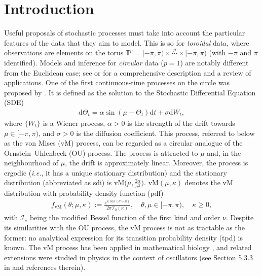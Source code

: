 \documentclass[oneside,11pt]{article}
\newcommand{\T}{\mathbb{T}}
\newcommand{\rd}{\mathrm{d}}
\newcommand{\Ical}{\mathcal{I}}
\begin{document}
\section{Introduction}
\label{sec:intro}

Useful proposals of stochastic processes must take into account the particular features of the data that they aim to model. This is so for \textit{toroidal} data, where observations are elements on the torus
$\T^p=[-\pi,\pi)\times\overset{p}{\cdots}\times[-\pi,\pi)$ (with $-\pi$ and $\pi$ identified). Models and
inference for \textit{circular} data ($p=1$) are notably different from the Euclidean
case; see \cite{Mardia2000} or \cite{Jammalamadaka2001} for
a comprehensive description and a review of applications. One of the first continuous-time processes on the circle was proposed by \cite{Kent1975}. It is defined
as the solution to the Stochastic Differential Equation (SDE)
\begin{align}
\rd \Theta_t=\alpha\sin(\mu-\Theta_t)\rd t+\sigma\rd W_t,\label{eq:vMOU}
\end{align}
where $\{W_t\}$ is a Wiener process, $\alpha>0$ is the strength of the drift towards $\mu\in[-\pi,\pi)$, and $\sigma>0$ is the diffusion coefficient. This process, referred to below as the von Mises (vM) process, can be regarded as a circular analogue of the Ornstein--Uhlenbeck (OU) process. The process is attracted to $\mu$ and, in the neighbourhood of $\mu$, the drift is approximately linear. Moreover, the process is ergodic (\textit{i.e.}, it has a unique stationary distribution) and the stationary distribution (abbreviated as sdi) is $\mathrm{vM}\big(\mu,
\frac{2\alpha}{\sigma^2}\big)$. $\mathrm{vM}(\mu,\kappa)$ denotes
the vM distribution with probability density function (pdf)
\begin{align*}
f_{\mathrm{vM}}(\theta;\mu,\kappa):=\frac{e^{\kappa\cos(\theta-\mu)}}{2\pi\Ical_0(\kappa)},\quad \theta,\mu\in[-\pi,\pi),\quad \kappa\geq0,
\end{align*}
with $\Ical_\nu$ being the modified Bessel
function of the first kind and order $\nu$. Despite its similarities with the OU process, the vM process is not as tractable as the former: no analytical expression for its transition probability density (tpd) is known. The vM process has been applied in
mathematical biology \citep{Hill1997,Codling2005}, and related
extensions were studied in physics in the context
of oscillators (see Section 5.3.3 in \cite{Frank2005} and references
therein).\\
\end{document}
